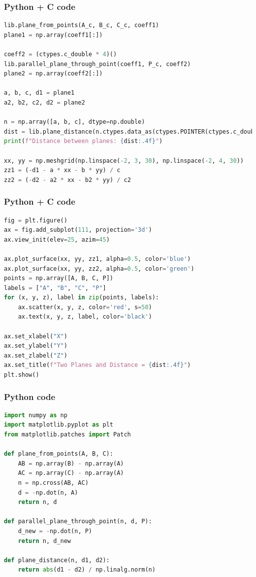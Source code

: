 \documentclass{beamer}
\begin{document}
\begin{frame}[fragile]
    \frametitle{Python + C code}

    \begin{lstlisting}[language=Python]
lib.plane_from_points(A_c, B_c, C_c, coeff1)
plane1 = np.array(coeff1[:])

coeff2 = (ctypes.c_double * 4)()
lib.parallel_plane_through_point(coeff1, P_c, coeff2)
plane2 = np.array(coeff2[:])

a, b, c, d1 = plane1
a2, b2, c2, d2 = plane2

n = np.array([a, b, c], dtype=np.double)
dist = lib.plane_distance(n.ctypes.data_as(ctypes.POINTER(ctypes.c_double)), d1, d2)
print(f"Distance between planes: {dist:.4f}")

xx, yy = np.meshgrid(np.linspace(-2, 3, 30), np.linspace(-2, 4, 30))
zz1 = (-d1 - a * xx - b * yy) / c
zz2 = (-d2 - a2 * xx - b2 * yy) / c2

    \end{lstlisting}
\end{frame}
\begin{frame}[fragile]
    \frametitle{Python + C code}

    \begin{lstlisting}[language=Python]
fig = plt.figure()
ax = fig.add_subplot(111, projection='3d')
ax.view_init(elev=25, azim=45)

ax.plot_surface(xx, yy, zz1, alpha=0.5, color='blue')
ax.plot_surface(xx, yy, zz2, alpha=0.5, color='green')
points = np.array([A, B, C, P])
labels = ["A", "B", "C", "P"]
for (x, y, z), label in zip(points, labels):
    ax.scatter(x, y, z, color='red', s=50)
    ax.text(x, y, z, label, color='black')

ax.set_xlabel("X")
ax.set_ylabel("Y")
ax.set_zlabel("Z")
ax.set_title(f"Two Planes and Distance = {dist:.4f}")
plt.show()
      \end{lstlisting}
\end{frame}
\begin{frame}[fragile]
    \frametitle{Python code}
    \begin{lstlisting}[language=Python]
import numpy as np
import matplotlib.pyplot as plt
from matplotlib.patches import Patch

def plane_from_points(A, B, C):
    AB = np.array(B) - np.array(A)
    AC = np.array(C) - np.array(A)
    n = np.cross(AB, AC)
    d = -np.dot(n, A)
    return n, d

def parallel_plane_through_point(n, d, P):
    d_new = -np.dot(n, P)
    return n, d_new

def plane_distance(n, d1, d2):
    return abs(d1 - d2) / np.linalg.norm(n)

    \end{lstlisting}
\end{frame}
\end{document}
